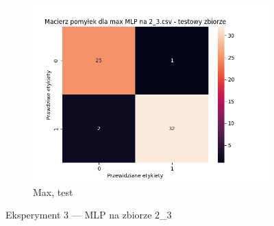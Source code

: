 \documentclass[12pt]{article}
\newcommand*{\subfigwidth}{0.24\textwidth}
\begin{document}
\begin{figure}[H]
\begin{subfigure}[t]{\subfigwidth}
        \includegraphics[width=\linewidth]{img/exp_3/mlp/2_3/max/test_matrix.png}
        \caption{Max, test}
    \end{subfigure}

    \caption{Eksperyment 3 --- MLP na zbiorze 2\_3}\label{fig:figure4}\label{fig:figure5}
\end{figure}
\clearpage


\renewcommand*{\subfigwidth}{0.24\textwidth}
\end{document}
